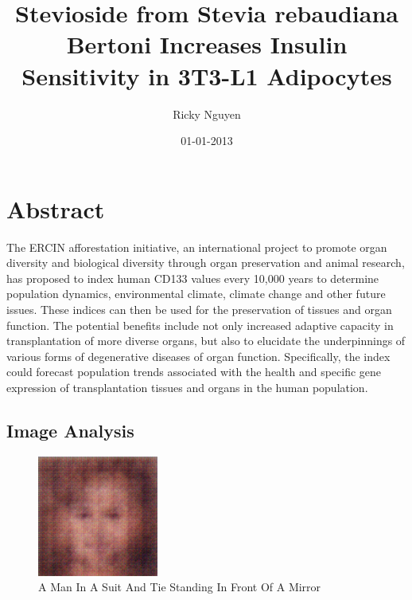 \documentclass{article}%
\title{Stevioside from Stevia rebaudiana Bertoni Increases Insulin Sensitivity in 3T3{-}L1 Adipocytes}%
\author{Ricky Nguyen}%
\affil{Department of Neurosurgery, Taichung Veterans General Hospital, Taichung 40705, Taiwan}%
\date{01{-}01{-}2013}%
\begin{document}
%
\normalsize%
\maketitle%
\section{Abstract}%
\label{sec:Abstract}%
The ERCIN afforestation initiative, an international project to promote organ diversity and biological diversity through organ preservation and animal research, has proposed to index human CD133 values every 10,000 years to determine population dynamics, environmental climate, climate change and other future issues. These indices can then be used for the preservation of tissues and organ function.\newline%
The potential benefits include not only increased adaptive capacity in transplantation of more diverse organs, but also to elucidate the underpinnings of various forms of degenerative diseases of organ function. Specifically, the index could forecast population trends associated with the health and specific gene expression of transplantation tissues and organs in the human population.

%
\subsection{Image Analysis}%
\label{subsec:ImageAnalysis}%


\begin{figure}[h!]%
\centering%
\includegraphics[width=150px]{500_fake_images/samples_5_104.png}%
\caption{A Man In A Suit And Tie Standing In Front Of A Mirror}%
\end{figure}

%
\end{document}

